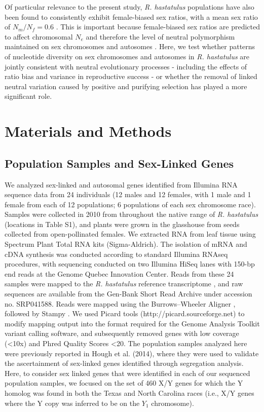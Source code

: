 \documentclass[9pt,twocolumn,twoside]{gsajnl}
\begin{document}
Of particular relevance to the present study, \textit{R. hastatulus} populations have also been found to consistently exhibit female-biased sex ratios, with a mean sex ratio of $N_{m}/N_{f}=0.6$ \citep{pickup2013influence}. This is important because female-biased sex ratios are predicted to affect chromosomal $N_{e}$ and therefore the level of neutral polymorphism maintained on sex chromosomes and autosomes \citep{ellegren2009}. Here, we test whether patterns of nucleotide diversity on sex chromosomes and autosomes in \textit{R. hastatulus} are jointly consistent with neutral evolutionary processes - including the effects of ratio bias and variance in reproductive success - or whether the removal of linked neutral variation caused by positive and purifying selection has played a more significant role.

\section*{Materials and Methods}
\subsection*{Population Samples and Sex-Linked Genes}
We analyzed sex-linked and autosomal genes identified from Illumina RNA sequence data from 24 individuals (12 males and 12 females, with 1 male and 1 female from each of 12 populations; 6 populations of each sex chromosome race). Samples were collected in 2010 from throughout the native range of \textit{R. hastatulus} (locations in Table S1), and plants were grown in the glasshouse from seeds collected from open-pollinated females. We extracted RNA from leaf tissue using Spectrum Plant Total RNA kits (Sigma-Aldrich). The isolation of mRNA and cDNA synthesis was conducted according to standard Illumina RNAseq procedures, with sequencing conducted on two Illumina HiSeq lanes with 150-bp end reads at the Genome Quebec Innovation Center. Reads from these 24 samples were mapped to the \textit{R. hastatulus} reference transcriptome \citep{hough2014}, and raw sequences are available from the Gen-Bank Short Read Archive under accession no. SRP041588. Reads were mapped using the Burrows–Wheeler Aligner \citep{li2010fast}, followed by Stampy \citep{lunter2011stampy}. We used Picard tools (http://picard.sourceforge.net) to modify mapping output into the format required for the Genome Analysis Toolkit \citep{mckenna2010genome} variant calling software, and subsequently removed genes with low coverage (<10x) and Phred Quality Scores <20. The population samples analyzed here were previously reported in Hough et al. (2014), where they were used to validate the ascertainment of sex-linked genes identified through segregation analysis. Here, to consider sex linked genes that were identified in each of our sequenced population samples, we focused on the set of 460 X/Y genes for which the Y homolog was found in both the Texas and North Carolina races (i.e., X/Y genes where the Y copy was inferred to be on the $Y_{1}$ chromosome).
\end{document}
